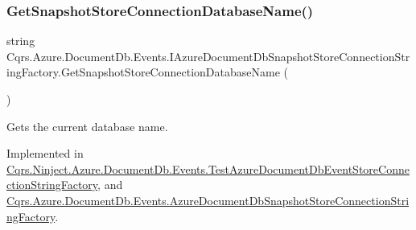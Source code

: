 \mbox{\label{interfaceCqrs_1_1Azure_1_1DocumentDb_1_1Events_1_1IAzureDocumentDbSnapshotStoreConnectionStringFactory_a1a6c06eeccfae14bcacae499972a4bcf_a1a6c06eeccfae14bcacae499972a4bcf}} 
\subsubsection{\texorpdfstring{Get\+Snapshot\+Store\+Connection\+Database\+Name()}{GetSnapshotStoreConnectionDatabaseName()}}
{\footnotesize\ttfamily string Cqrs.\+Azure.\+Document\+Db.\+Events.\+I\+Azure\+Document\+Db\+Snapshot\+Store\+Connection\+String\+Factory.\+Get\+Snapshot\+Store\+Connection\+Database\+Name (\begin{DoxyParamCaption}{ }\end{DoxyParamCaption})}



Gets the current database name. 



Implemented in \hyperlink{classCqrs_1_1Ninject_1_1Azure_1_1DocumentDb_1_1Events_1_1TestAzureDocumentDbEventStoreConnectionStringFactory_aaa0c39bc546645fe2f8fc6c5ea9736ec_aaa0c39bc546645fe2f8fc6c5ea9736ec}{Cqrs.\+Ninject.\+Azure.\+Document\+Db.\+Events.\+Test\+Azure\+Document\+Db\+Event\+Store\+Connection\+String\+Factory}, and \hyperlink{classCqrs_1_1Azure_1_1DocumentDb_1_1Events_1_1AzureDocumentDbSnapshotStoreConnectionStringFactory_a7e27bfdf697514310a63cc673aa8d800_a7e27bfdf697514310a63cc673aa8d800}{Cqrs.\+Azure.\+Document\+Db.\+Events.\+Azure\+Document\+Db\+Snapshot\+Store\+Connection\+String\+Factory}.

